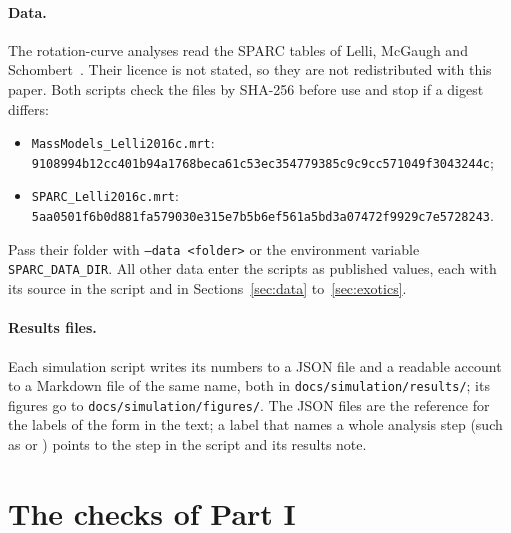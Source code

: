 \paragraph{Data.} The rotation-curve analyses read the SPARC tables of Lelli, McGaugh and Schombert~\cite{lelli2016}. Their licence is not
stated, so they are not redistributed with this paper. Both scripts check the files by SHA-256 before use and stop if a digest differs:
\begin{itemize}[nosep]
\item \texttt{MassModels\_Lelli2016c.mrt}:\\ {\footnotesize\texttt{9108994b12cc401b94a1768beca61c53ec354779385c9c9cc571049f3043244c}};
\item \texttt{SPARC\_Lelli2016c.mrt}:\\ {\footnotesize\texttt{5aa0501f6b0d881fa579030e315e7b5b6ef561a5bd3a07472f9929c7e5728243}}.
\end{itemize}
Pass their folder with \texttt{--data <folder>} or the environment variable \texttt{SPARC\_DATA\_DIR}. All other data enter the scripts
as published values, each with its source in the script and in Sections~\ref{sec:data} to~\ref{sec:exotics}.

\paragraph{Results files.} Each simulation script writes its numbers to a JSON file and a readable account to a Markdown file of the
same name, both in \texttt{docs/simulation/results/}; its figures go to \texttt{docs/simulation/figures/}. The JSON files are the reference for the labels of the form  in the
text; a label that names a whole analysis step (such as  or ) points to the step in the script and its
results note.

\section{The checks of Part I}\label{app:checks}

